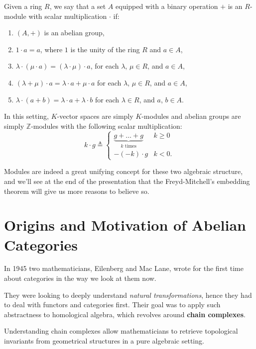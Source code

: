 \documentclass{beamer}
\newcommand{\ZZ}{\mathbb{Z}}
\begin{document}
\begin{frame}
    \begin{definition}[$R$-module]
        Given a ring $R$, we say that a set $A$ equipped with a binary operation $+$ is an $R$-module with
        scalar multiplication $\cdot$ if:
        \begin{enumerate}
            \item $(A, +)$ is an abelian group,
            \item $1 \cdot a = a$, where $1$ is the unity of the ring $R$ and $a \in A$,
            \item $\lambda \cdot (\mu \cdot a) = (\lambda \cdot \mu) \cdot a$, for each $\lambda$, $\mu \in R$, and $a \in A$, 
            \item $(\lambda + \mu) \cdot a = \lambda \cdot a + \mu \cdot a$ for each $\lambda$, $\mu \in R$, and $a \in A$,
            \item $\lambda \cdot (a + b) = \lambda \cdot a + \lambda \cdot b$ for each $\lambda \in R$, and $a$, $b \in A$.
        \end{enumerate}
    \end{definition}
\end{frame}

\begin{frame}
    In this setting, $K$-vector spaces are simply $K$-modules and abelian groups
    are simply $\ZZ$-modules with the following scalar multiplication:
    \[
        k \cdot g \triangleq \begin{cases}
            \underbrace{g + \ldots + g}_{k \text{ times}} & k \geq 0 \\
            -(-k) \cdot g & k < 0.
        \end{cases}
    \] \smallskip

    Modules are indeed a great unifying concept for these two algebraic structure, and we'll see
    at the end of the presentation that the Freyd-Mitchell's embedding theorem will
    give us more reasons to believe so.
\end{frame}


\section{Origins and Motivation of Abelian Categories}

\begin{frame}
    In 1945 two mathematicians, Eilenberg and Mac Lane, wrote for the
    first time about categories in the way we look at them now. \medskip
    
    They were looking to
    deeply understand \textit{natural transformations}, hence they had
    to deal with functors and categories first. Their goal was to
    apply such abstractness to homological algebra, which revolves
    around \textbf{chain complexes}. \medskip

    Understanding chain complexes allow mathematicians to retrieve
    topological invariants from geometrical structures in a pure
    algebraic setting.
\end{frame}
\end{document}
